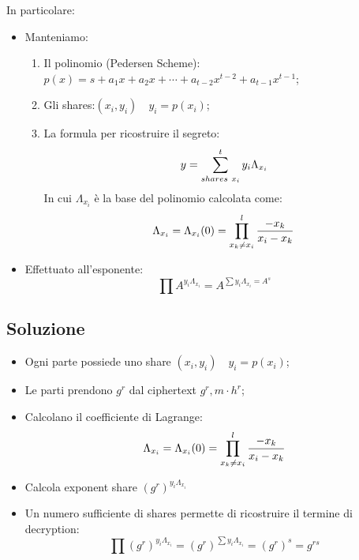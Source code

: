 \documentclass{book}
\begin{document}
In particolare:\begin{itemize}
    \item Manteniamo:\begin{enumerate}
              \item Il polinomio (Pedersen Scheme): \(p(x)=s+a_{1}x+a_{2}x+\cdots+a_{t-2}x^{t-2}+a_{t-1}x^{t-1}\);
              \item Gli shares:\((x_{i},y_{i})\quad y_{i}=p(x_{i})\);
              \item La formula per ricostruire il segreto:
                    \begin{equation*}
                        \centering
                        y=\sum_{shares\ x_{i}}^{t}{y_{i}\Lambda_{x_{i}}}
                    \end{equation*}
                    In cui \(\Lambda_{x_{i}}\) è la base del polinomio calcolata come:
                    \begin{equation*}
                        \centering
                        \Lambda_{x_{i}}=\Lambda_{x_{i}}(0)=\prod_{x_{k}\neq x_{i}}^{l}{\frac{-x_{k}}{x_{i}-x_{k}}}
                    \end{equation*}
          \end{enumerate}
    \item Effettuato all'esponente:\begin{equation*}
              \prod{ A^{y_{i}\Lambda_{x_{i}}}}=A^{\sum{y_{i}\Lambda_{x_{i}}}=A^{s}}
          \end{equation*}
\end{itemize}
\subsection{Soluzione}
\begin{itemize}
    \item Ogni parte possiede uno share \( (x_{i},y_{i})\quad y_{i}=p(x_{i})\);
    \item Le parti prendono \(g^{r}\) dal ciphertext \(g^{r},m\cdot h^{r}\);
    \item Calcolano il coefficiente di Lagrange:\begin{equation*}
              \centering
              \Lambda_{x_{i}}=\Lambda_{x_{i}}(0)=\prod_{x_{k}\neq x_{i}}^{l}{\frac{-x_{k}}{x_{i}-x_{k}}}
          \end{equation*}
    \item Calcola exponent share \({(g^{r})}^{y_{i}\Lambda_{x_{i}}}\)
    \item Un numero sufficiente di shares permette di ricostruire il termine di decryption:\begin{equation*}
              \prod{(g^{r})}^{y_{i}\Lambda_{x_{i}}}={(g^{r})}^{\sum{y_{i}\Lambda_{x_{i}}}}={(g^{r})}^{s}=g^{rs}
          \end{equation*}
\end{itemize}
\end{document}
